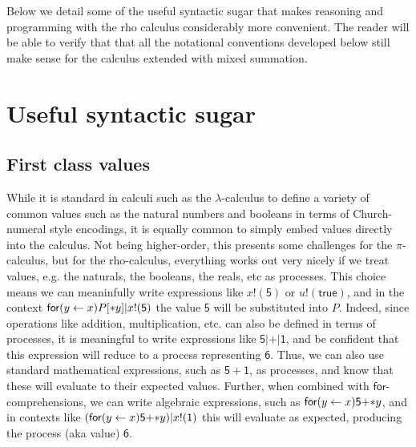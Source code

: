 \begin{remark}
  Below we detail some of the useful syntactic sugar that makes
  reasoning and programming with the rho calculus considerably more
  convenient. The reader will be able to verify that that all the
  notational conventions developed below still make sense for the
  calculus extended with mixed summation.
\end{remark}


\section{Useful syntactic sugar}

\subsection{First class values}
While it is standard in calculi such as the $\lambda$-calculus to
define a variety of common values such as the natural numbers and
booleans in terms of Church-numeral style encodings, it is equally
common to simply embed values directly into the calculus. Not being
higher-order, this presents some challenges for the $\pi$-calculus,
but for the rho-calculus, everything works out very nicely if we treat
values, e.g. the naturals, the booleans, the reals, etc as processes. This
choice means we can meaninfully write expressions like
$x!(\mathsf{5})$ or $u!(\mathsf{true})$, and in the context
$\prefix{x}{y}P[*y] \mathsf{|} x!(\mathsf{5})$ the value $\mathsf{5}$
will be substituted into $P$. Indeed, since operations like addition,
multiplication, etc.  can also be defined in terms of processes, it is
meaningful to write expressions like
$\mathsf{5}\mathsf{|}\mathsf{+}\mathsf{|}\mathsf{1}$, and be confident
that this expression will reduce to a process representing
$\mathsf{6}$. Thus, we can also use standard mathematical expressions,
such as $\mathsf{5+1}$, as processes, and know that these will
evaluate to their expected values. Further, when combined with
$\mathsf{for}$-comprehensions, we can write algebraic expressions,
such as $\prefix{x}{y}\mathsf{5}\mathsf{+}\mathsf{*}y$, and in
contexts like
$(\prefix{x}{y}\mathsf{5}\mathsf{+}\mathsf{*}y)\mathsf{|}\outputp{x}{\mathsf{1}}$
this will evaluate as expected, producing the process (aka value)
$\mathsf{6}$.

